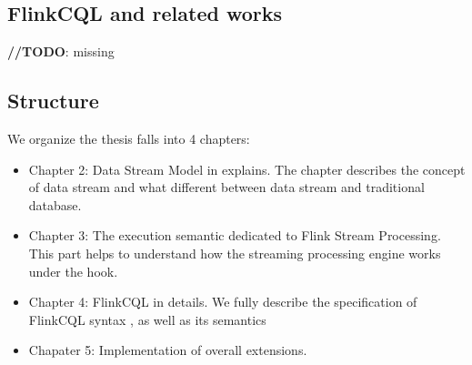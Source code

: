 \subsection*{FlinkCQL and related works}
\textbf{//TODO}: missing

\subsection*{Structure}
We organize the thesis falls into 4 chapters:
\begin{itemize}
	\item Chapter 2: Data Stream Model in explains. The chapter describes the concept of data stream and what different between data stream and traditional database. 
	\item Chapter 3: The execution semantic dedicated to Flink Stream Processing. This part helps to understand how the streaming processing engine works under the hook.
	\item Chapter 4: FlinkCQL in details. We fully describe the specification of FlinkCQL syntax , as well as its semantics
	\item Chapater 5: Implementation of overall extensions.
\end{itemize}







 
 
 

